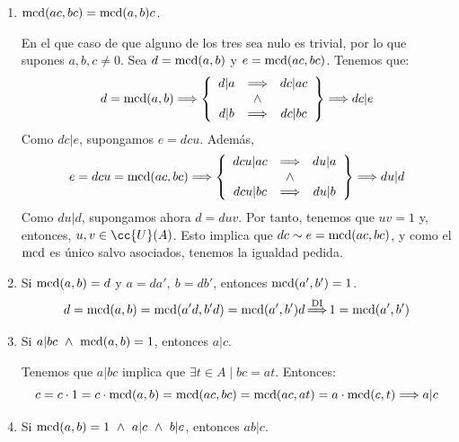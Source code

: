 \begin{enumerate}
    Una vez demostrada la primera igualdad, para la segunda tenemos que:
    $$\mcd(a,b,c) = \mcd(b,c,a) = \mcd(\mcd(b,c), a) = \mcd(a, \mcd(b,c))$$

    \item $\operatorname{mcd}(ac,bc) = \operatorname{mcd}(a,b)c$.

    En el que caso de que alguno de los tres sea nulo es trivial, por lo que supones $a,b,c\neq 0$. Sea $d=\operatorname{mcd}(a,b)$ y $e=\operatorname{mcd}(ac,bc)$. Tenemos que:
    \begin{equation*}
        d=\operatorname{mcd}(a,b) \Longrightarrow \left\{
        \begin{array}{ccc}
            d|a & \Longrightarrow & dc|ac  \\
            &\land& \\
            d|b & \Longrightarrow & dc|bc  \\
        \end{array}
        \right\} \Longrightarrow dc|e
    \end{equation*}
    Como $dc|e$, supongamos $e=dcu$. Además, 
    \begin{equation*}
        e=dcu=\operatorname{mcd}(ac,bc) \Longrightarrow \left\{
        \begin{array}{ccc}
            dcu|ac & \Longrightarrow & du|a  \\
            &\land& \\
            dcu|bc & \Longrightarrow & du|b  \\
        \end{array}
        \right\} \Longrightarrow du|d
    \end{equation*}
    Como $du|d$, supongamos ahora $d=duv$. Por tanto, tenemos que $uv=1$ y, entonces, $u,v\in \cc{U}(A)$. Esto implica que $dc\sim e=\operatorname{mcd}(ac,bc)$, y como el $\operatorname{mcd}$ es único salvo asociados, tenemos la igualdad pedida.

    \item Si $\operatorname{mcd}(a,b)=d$ y $a=da',~ b=db'$, entonces $\operatorname{mcd}(a',b')=1$.
    $$d = \operatorname{mcd}(a,b) = \operatorname{mcd}(a'd, b'd) = \operatorname{mcd}(a',b')d \mathop{\Longrightarrow}^{\text{DI}} 1=\operatorname{mcd}(a',b')$$

    \item Si $a|bc \ \land \  \operatorname{mcd}(a,b)=1$, entonces $a|c$.

    Tenemos que $a|bc$ implica que $\exists t \in A \mid bc=at$. Entonces:
    $$c= c \cdot 1 = c \cdot \operatorname{mcd}(a,b) = \operatorname{mcd}(ac, bc) = \operatorname{mcd}(ac, at) = a \cdot \operatorname{mcd}(c,t) \Longrightarrow a|c$$

    \item Si $\operatorname{mcd}(a,b)=1 \ \land \  a|c \ \land \  b|c$, entonces $ab|c$.


\end{enumerate}
